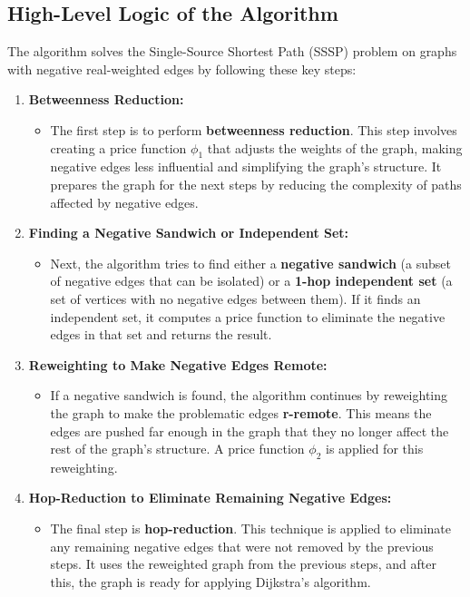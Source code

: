 \documentclass[12pt]{article}
\begin{document}
\subsection*{High-Level Logic of the Algorithm}

The algorithm solves the Single-Source Shortest Path (SSSP) problem on graphs with negative real-weighted edges by following these key steps:

\begin{enumerate}
    \item \textbf{Betweenness Reduction:}
    \begin{itemize}
        \item The first step is to perform \textbf{betweenness reduction}. This step involves creating a price function \( \phi_1 \) that adjusts the weights of the graph, making negative edges less influential and simplifying the graph's structure. It prepares the graph for the next steps by reducing the complexity of paths affected by negative edges.
    \end{itemize}

    \item \textbf{Finding a Negative Sandwich or Independent Set:}
    \begin{itemize}
        \item Next, the algorithm tries to find either a \textbf{negative sandwich} (a subset of negative edges that can be isolated) or a \textbf{1-hop independent set} (a set of vertices with no negative edges between them). If it finds an independent set, it computes a price function to eliminate the negative edges in that set and returns the result.
    \end{itemize}

    \item \textbf{Reweighting to Make Negative Edges Remote:}
    \begin{itemize}
        \item If a negative sandwich is found, the algorithm continues by reweighting the graph to make the problematic edges \textbf{r-remote}. This means the edges are pushed far enough in the graph that they no longer affect the rest of the graph's structure. A price function \( \phi_2 \) is applied for this reweighting.
    \end{itemize}

    \item \textbf{Hop-Reduction to Eliminate Remaining Negative Edges:}
    \begin{itemize}
        \item The final step is \textbf{hop-reduction}. This technique is applied to eliminate any remaining negative edges that were not removed by the previous steps. It uses the reweighted graph from the previous steps, and after this, the graph is ready for applying Dijkstra’s algorithm.
    \end{itemize}
\end{enumerate}
\end{document}
